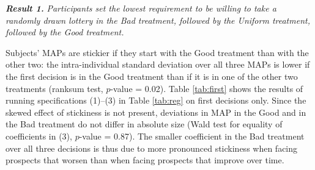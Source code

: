 \textbf{\textit{Result 1.}} \textit{Participants set the lowest requirement to be willing to take a randomly drawn lottery in the Bad treatment, followed by the Uniform treatment, followed by the Good treatment.}

Subjects' MAPs are stickier if they start with the Good treatment than with the other two: the intra-individual standard deviation over all three MAPs is lower if the first decision is in the Good treatment than if it is in one of the other two treatments (ranksum test, $p$-value = 0.02).
Table \ref{tab:first} shows the results of running specifications (1)--(3) in Table \ref{tab:reg} on first decisions only.
Since the skewed effect of stickiness is not present, deviations in MAP in the Good and in the Bad treatment do not differ in absolute size (Wald test for equality of coefficients in (3), $p$-value = 0.87).
The smaller coefficient in the Bad treatment over all three decisions is thus due to more pronounced stickiness when facing prospects that worsen than when facing prospects that improve over time.

